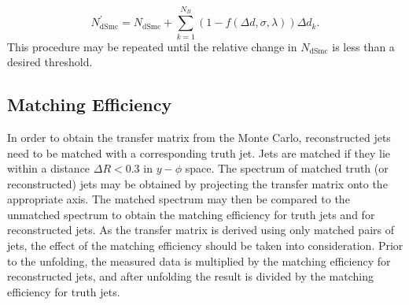 \begin{equation}
N_{\mathrm{dSmc}}^\prime = N_{\mathrm{dSmc}} + \sum_{k=1}^{N_B} \left ( 1 - f\left(\Delta d,\sigma,\lambda \right )\right) \Delta d_k .
\label{unfold_norm_eq}
\end{equation}
This procedure may be repeated until the relative change in $N_{\mathrm{dSmc}}$ is less than a desired threshold.



\subsection{Matching Efficiency}
In order to obtain the transfer matrix from the Monte Carlo, reconstructed jets need to be matched with a corresponding truth jet. Jets are matched if they lie within a distance $\Delta R < 0.3$ in $y-\phi$ space. The spectrum of matched truth (or reconstructed) jets may be obtained by projecting the transfer matrix onto the appropriate axis. The matched spectrum may then be compared to the unmatched spectrum to obtain the matching efficiency for truth jets and for reconstructed jets. As the transfer matrix is derived using only matched pairs of jets, the effect of the matching efficiency should be taken into consideration. Prior to the unfolding, the measured data is multiplied by the matching efficiency for reconstructed jets, and after unfolding the result is divided by the matching efficiency for truth jets. 



 
 
 
 
 
